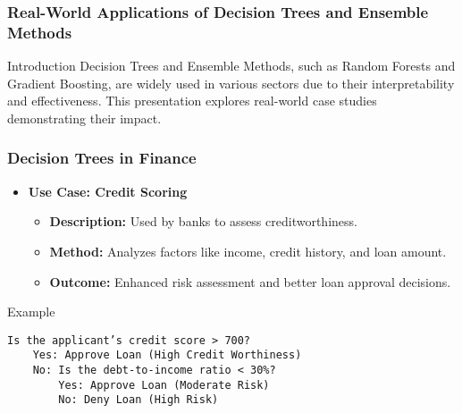 \documentclass{beamer}
\begin{document}
\begin{frame}
    \frametitle{Real-World Applications of Decision Trees and Ensemble Methods}
    \begin{block}{Introduction}
        Decision Trees and Ensemble Methods, such as Random Forests and Gradient Boosting, are widely used in various sectors due to their interpretability and effectiveness. This presentation explores real-world case studies demonstrating their impact.
    \end{block}
\end{frame}

\begin{frame}[fragile]
    \frametitle{Decision Trees in Finance}
    \begin{itemize}
        \item \textbf{Use Case: Credit Scoring}
        \begin{itemize}
            \item \textbf{Description:} Used by banks to assess creditworthiness.
            \item \textbf{Method:} Analyzes factors like income, credit history, and loan amount.
            \item \textbf{Outcome:} Enhanced risk assessment and better loan approval decisions.
        \end{itemize}
    \end{itemize}

    \begin{block}{Example}
        \begin{lstlisting}
Is the applicant’s credit score > 700?
    Yes: Approve Loan (High Credit Worthiness)
    No: Is the debt-to-income ratio < 30%?
        Yes: Approve Loan (Moderate Risk)
        No: Deny Loan (High Risk)
        \end{lstlisting}
    \end{block}
\end{frame}
\end{document}
